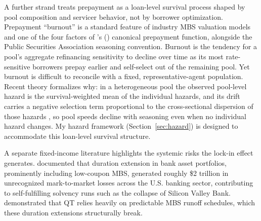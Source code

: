 \documentclass[12pt]{article}
\newcommand{\citepos}[1]{\citeauthor{#1}'s (\citeyear{#1})}
\begin{document}
A further strand treats prepayment as a loan-level survival process shaped by pool composition and servicer behavior, not by borrower optimization. Prepayment ``burnout'' is a standard feature of industry MBS valuation models and one of the four factors of \citepos{richard1989} canonical prepayment function, alongside the Public Securities Association seasoning convention. Burnout is the tendency for a pool's aggregate refinancing sensitivity to decline over time as its most rate-sensitive borrowers prepay earlier and self-select out of the remaining pool. Yet burnout is difficult to reconcile with a fixed, representative-agent population. Recent theory formalizes why: in a heterogeneous pool the observed pool-level hazard is the survival-weighted mean of the individual hazards, and its drift carries a negative selection term proportional to the cross-sectional dispersion of those hazards \citep[arXiv preprint]{lesniewski2026}, so pool speeds decline with seasoning even when no individual hazard changes. My hazard framework (Section~\ref{sec:hazard}) is designed to accommodate this loan-level survival structure.

A separate fixed-income literature highlights the systemic risks the lock-in effect generates. \citet{jiang2023} documented that duration extension in bank asset portfolios, prominently including low-coupon MBS, generated roughly \$2 trillion in unrecognized mark-to-market losses across the U.S. banking sector, contributing to self-fulfilling solvency runs such as the collapse of Silicon Valley Bank. \citet{smith2023} demonstrated that QT relies heavily on predictable MBS runoff schedules, which these duration extensions structurally break.
\end{document}
